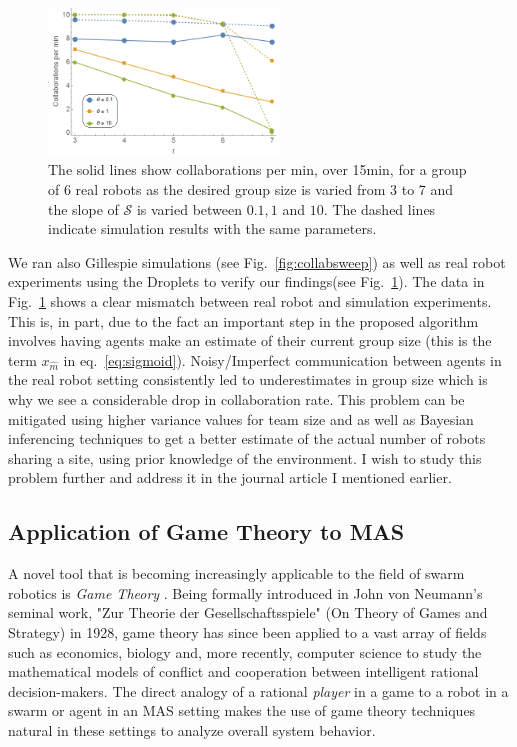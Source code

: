 \documentclass[11pt, onecolumn, compsoc, letterpaper]{article}
\newcommand{\sig}{\mathcal{S}}
\newcommand{\xm}{x_{\hat{m}}}
\begin{document}
\begin{figure}[!htb]
\centering\includegraphics[width=0.55\textwidth]{../assets/realsimexpnew.png}
\caption{The solid lines show collaborations per min, over 15min, for a group of 6 real robots as the desired group size is varied from 3 to 7 and the slope of $\sig$ is varied between $0.1, 1$ and $10$. The dashed lines indicate simulation results with the same parameters.\label{fig:expdat} }
\end{figure}

We ran also Gillespie simulations \cite{Gillespie1976, Gillespie1977} (see Fig.~\ref{fig:collabsweep}) as well as real robot experiments using the Droplets to verify our findings(see Fig.~\ref{fig:expdat}). The data in Fig.~\ref{fig:expdat} shows a clear mismatch between real robot and simulation experiments. This is, in part, due to the fact an important step in the proposed algorithm involves having agents make an estimate of their current group size (this is the term $\xm$ in eq.~\ref{eq:sigmoid}). Noisy/Imperfect communication between agents in the real robot setting consistently led to underestimates in group size which is why we see a considerable drop in collaboration rate. This problem can be mitigated using higher variance values for team size and as well as Bayesian inferencing techniques to get a better estimate of the actual number of robots sharing a site, using prior knowledge of the environment. I wish to study this problem further and address it in the journal article I mentioned earlier.

\subsection{Application of Game Theory to MAS}
A novel tool that is becoming increasingly applicable to the field of swarm robotics is \emph{Game Theory} \cite{GivigiJr2006, Panait2005}. Being formally introduced in John von Neumann's seminal work, "Zur Theorie der Gesellschaftsspiele" (On Theory of Games and Strategy) in 1928, game theory has since been applied to a vast array of fields such as economics, biology and, more recently, computer science to study the mathematical models of conflict and cooperation between intelligent rational decision-makers. The direct analogy of  a rational \emph{player} in a game to a robot in a swarm or agent in an MAS setting makes the use of game theory techniques natural in these settings to analyze overall system behavior.
\end{document}
